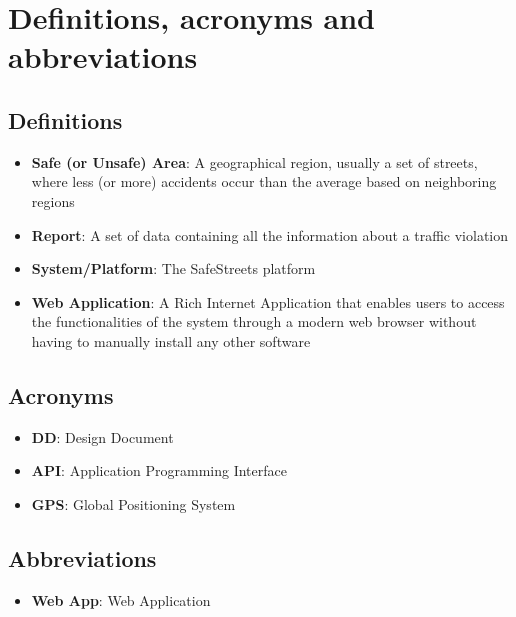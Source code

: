 \section{Definitions, acronyms and abbreviations}

\subsection{Definitions}
\begin{itemize}
  \item \textbf{Safe (or Unsafe) Area}: A geographical region, usually a set of streets, where less (or more) accidents occur than the average based on neighboring regions
  \item \textbf{Report}: A set of data containing all the information about a traffic violation
  \item \textbf{System/Platform}: The SafeStreets platform
  \item \textbf{Web Application}: A Rich Internet Application that enables users to access the functionalities of the system through a modern web browser without having to manually install any other software
\end{itemize}

\subsection{Acronyms}
\begin{itemize}
  \item \textbf{DD}: Design Document
  \item \textbf{API}: Application Programming Interface
  \item \textbf{GPS}: Global Positioning System
\end{itemize}

\subsection{Abbreviations}
\begin{itemize}
  \item \textbf{Web App}: Web Application
\end{itemize}